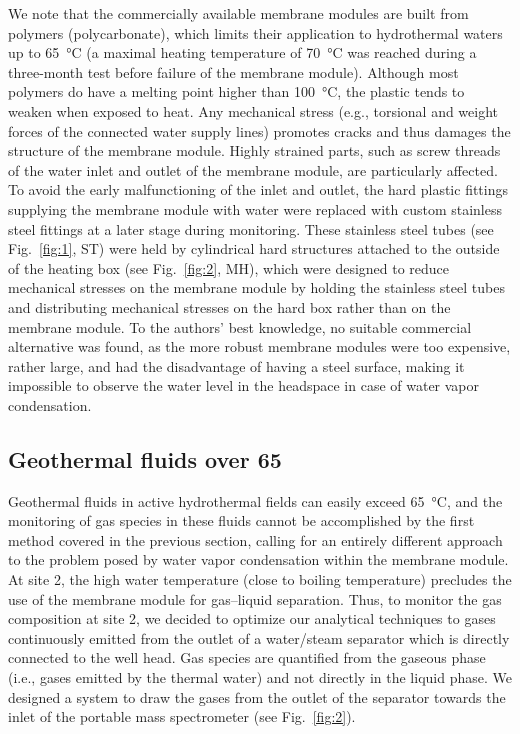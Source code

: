 We note that the commercially available membrane modules are built from polymers (polycarbonate), which limits their application to hydrothermal waters up to \SI{65}{\celsius} (a maximal heating temperature of \SI{70}{\celsius} was reached during a three-month test before failure of the membrane module).
Although most polymers do have a melting point higher than \SI{100}{\celsius}, the plastic tends to weaken when exposed to heat.
Any mechanical stress (e.g., torsional and weight forces of the connected water supply lines) promotes cracks and thus damages the structure of the membrane module.
Highly strained parts, such as screw threads of the water inlet and outlet of the membrane module, are particularly affected.
To avoid the early malfunctioning of the inlet and outlet, the hard plastic fittings supplying the membrane module with water were replaced with custom stainless steel fittings at a later stage during monitoring. 
These stainless steel tubes (see Fig.~\ref{fig:1}, ST) were held by cylindrical hard structures attached to the outside of the heating box (see Fig.~\ref{fig:2}, MH), which were designed to reduce mechanical stresses on the membrane module by holding the stainless steel tubes and distributing mechanical stresses on the hard box rather than on the membrane module.
To the authors' best knowledge, no suitable commercial alternative was found, as the more robust membrane modules were too expensive, rather large, and had the disadvantage of having a steel surface, making it impossible to observe the water level in the headspace in case of water vapor condensation. 

\subsection{Geothermal fluids over 65\textcelsius }\label{sec:high} 
Geothermal fluids in active hydrothermal fields can easily exceed \SI{65}{\celsius}, and the monitoring of gas species in these fluids cannot be accomplished by the first method covered in the previous section, calling for an entirely different approach to the problem posed by water vapor condensation within the membrane module.
At site 2, the high water temperature (close to boiling temperature) precludes the use of the membrane module for gas--liquid separation.
Thus, to monitor the gas composition at site 2, we decided to optimize our analytical techniques to gases continuously emitted from the outlet of a water/steam separator which is directly connected to the well head.
Gas species are quantified from the gaseous phase (i.e., gases emitted by the thermal water) and not directly in the liquid phase. 
We designed a system to draw the gases from the outlet of the separator towards the inlet of the portable mass spectrometer (see Fig.~\ref{fig:2}).

